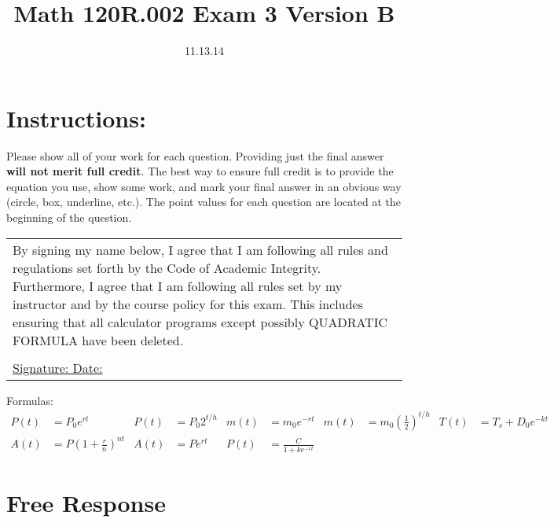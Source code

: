\documentclass[fleqn]{article}
\renewcommand{\thispagestyle}[1]{}
\begin{document}
\title{Math 120R.002 Exam 3 Version B}
\date{11.13.14}
\maketitle

\section*{Instructions:} 
Please show all of your work for each question. Providing just the final answer \textbf{will not merit full credit}. The best way to ensure full credit is to provide the equation you use, show some work, and mark your final answer in an obvious way (circle, box, underline, etc.). The point values for each question are located at the beginning of the question.

\vspace{1in} 

\begin{tabular}{|p{6.5in}|} 
\hline 
\noindent By signing my name below, I agree that I am following all rules and regulations set forth by the Code of Academic Integrity.  Furthermore, I agree that I am following all rules set by my instructor and by the course policy for this exam.  This includes ensuring that all calculator programs except possibly QUADRATIC FORMULA have been deleted.\\
\vspace{.3 in}\\
\underline{Signature:	\hspace{2.5 in}	Date:\hspace{1.25 in}}\\
\hline 
\end{tabular} 

\vspace{1 in}

Formulas:
\begin{align*}
P(t) & = P_0 e^{rt} & P(t) & = P_0 2^{t/h} & m(t) & = m_0 e^{-rt} & m(t) & = m_0 (\frac{1}{2})^{t/h} & T(t) &= T_s + D_0 e^{-kt} \\
A(t) & = P ( 1 + \frac{r}{n})^{nt} & A(t) & = P e^{rt} & P(t) & = \frac{C}{1 + ke^{-rt}}
\end{align*}

\pagebreak
\thispagestyle{fancy}{
\lhead{}
}

\section*{Free Response}
\end{document}
